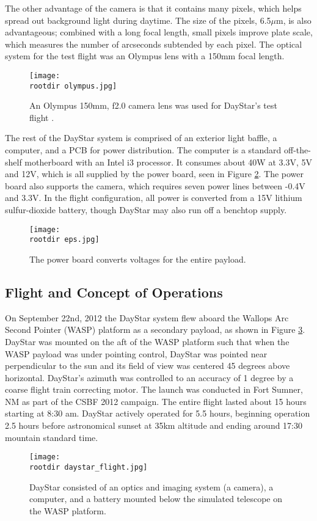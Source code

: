 \documentclass[twocolumn,letterpaper]{IEEEAerospace2012}
\newcommand{\rootdir}{./Figures/}
\begin{document}
The other advantage of the camera is that it contains many pixels, which helps spread out background light during daytime. The size of the pixels, 6.5$\mu$m, is also advantageous; combined with a long focal length, small pixels improve plate scale, which measures the number of arcseconds subtended by each pixel. The optical system for the test flight was an Olympus lens with a 150mm focal length.

\begin{figure}[H]
    \centering
    \texttt{[image: \\rootdir olympus.jpg]}
    \caption{An Olympus 150mm, f2.0 camera lens was used for DayStar's test flight \protect\cite{olympus}.}
    \label{fig:olympus}
\end{figure}
The rest of the DayStar system is comprised of an exterior light baffle, a computer, and a PCB for power distribution. The computer is a standard off-the-shelf motherboard with an Intel i3 processor. It consumes about 40W at 3.3V, 5V and 12V, which is all supplied by the power board, seen in Figure \ref{fig:power}. The power board also supports the camera, which requires seven power lines between -0.4V and 3.3V. In the flight configuration, all power is converted from a 15V lithium sulfur-dioxide battery, though DayStar may also run off a benchtop supply.
\begin{figure}[H]
    \texttt{[image: \\rootdir eps.jpg]}
    \caption{The power board converts voltages for the entire payload.}
    \label{fig:power}
\end{figure}

\subsection{Flight and Concept of Operations}
On September 22nd, 2012 the DayStar system flew aboard the Wallops Arc Second Pointer (WASP) platform as a secondary payload, as shown in Figure \ref{fig:flight}. DayStar was mounted on the aft of the WASP platform such that when the WASP payload was under pointing control, DayStar was pointed near perpendicular to the sun and its field of view was centered 45 degrees above horizontal. DayStar's azimuth was controlled to an accuracy of 1 degree by a coarse flight train correcting motor. The launch was conducted in Fort Sumner, NM as part of the CSBF 2012 campaign. The entire flight lasted about 15 hours starting at 8:30 am. DayStar actively operated for 5.5 hours, beginning operation 2.5 hours before astronomical sunset at 35km altitude and ending around 17:30 mountain standard time.
\begin{figure}
    \centering
    \texttt{[image: \\rootdir daystar\_flight.jpg]}
    \caption{DayStar consisted of an optics and imaging system (a camera), a computer, and a battery mounted below the simulated telescope on the WASP platform.}
    \label{fig:flight}
\end{figure}
\end{document}
